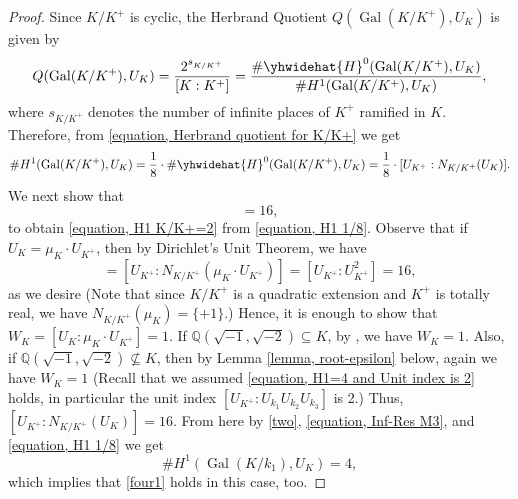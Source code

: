 \documentclass[12pt]{amsart}
\theoremstyle{definition}
\numberwithin{equation}{section}
\DeclareMathOperator{\Gal}{Gal}
\begin{document}
\begin{proof}
Since $K/K^+$ is cyclic, the Herbrand Quotient $Q(\Gal(K/K^+),U_K)$ is given by
\begin{equation} \label{equation, Herbrand quotient for K/K+}
Q(\Gal(K/K^+),U_K)=\frac{2^{s_{K/K^+}}}{[K:K^+]}=\frac{\# \yhwidehat{H}^0(\Gal(K/K^+),U_K)}{\# H^1(\Gal(K/K^+),U_K)},
\end{equation}
where $s_{K/K^+}$ denotes the number of infinite places of $K^+$ ramified in $K$. Therefore, from \eqref{equation, Herbrand quotient for K/K+} we get
\begin{equation} \label{equation, H1 1/8}
\# H^1(\Gal(K/K^+),U_K)=\frac{1}{8} \cdot \# \yhwidehat{H}^0(\Gal(K/K^+),U_K)=\frac{1}{8} \cdot [U_{K^+}:N_{K/K^+}(U_K)].
\end{equation}
We next show that
\begin{equation*}
[U_{K^+}:N_{K/K^+}(U_K)]=16,
\end{equation*}
to obtain \eqref{equation, H1 K/K+=2} from \eqref{equation, H1 1/8}. Observe that if $U_K=\mu_K\cdot U_{K^+}$, then by  Dirichlet's Unit Theorem, we have
\begin{equation*}
	[U_{K^+}:N_{K/K^+}(U_K)]=[U_{K^+}:N_{K/K^+}(\mu_K\cdot U_{K^+})]=[U_{K^+}: U_{K^+}^2]=16,
	\end{equation*}
	as we desire
(Note that since $K/K^+$ is a quadratic extension and $K^+$ is totally real, we have $N_{K/K^+}(\mu_K)=\{+1\}$.) Hence, it is enough to show that $W_K=\left[U_K : \mu_K \cdot U_{K^+}\right]=1$.
		If $\mathbb{Q}(\sqrt{-1},\sqrt{-2}) \subseteq K$,  by \cite[Theorem 2]{Hirabayashi}, we have $W_K=1$. Also,
		if $\mathbb{Q}(\sqrt{-1},\sqrt{-2}) \not \subseteq K$, then by Lemma \ref{lemma, root-epsilon} below, again we have  $W_K=1$ (Recall that we assumed \eqref{equation, H1=4 and Unit index is 2} holds, in particular the unit index $\left[U_{K^+}: U_{k_1} U_{k_2} U_{k_3}\right]$ is 2.)
Thus, $[U_{K^+}:N_{K/K^+}(U_K)]=16$.  
From here by \eqref{two}, \eqref{equation, Inf-Res M3}, and  \eqref{equation, H1 1/8} we get
\begin{equation*}
	\# H^1(\Gal(K/k_1),U_K)=4,
\end{equation*}
which implies that \eqref{four1} holds in this case, too.
\end{proof}
\end{document}
